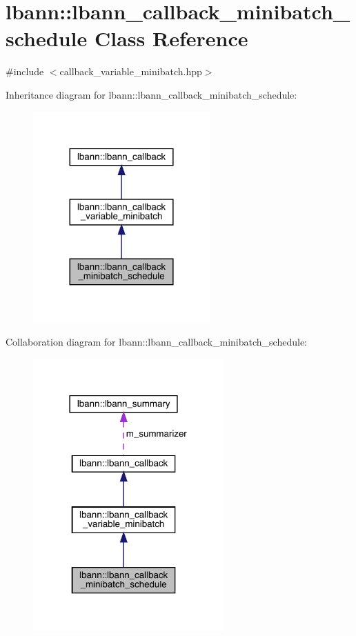 \hypertarget{classlbann_1_1lbann__callback__minibatch__schedule}{}\section{lbann\+:\+:lbann\+\_\+callback\+\_\+minibatch\+\_\+schedule Class Reference}
\label{classlbann_1_1lbann__callback__minibatch__schedule}


{\ttfamily \#include $<$callback\+\_\+variable\+\_\+minibatch.\+hpp$>$}



Inheritance diagram for lbann\+:\+:lbann\+\_\+callback\+\_\+minibatch\+\_\+schedule\+:\nopagebreak
\begin{figure}[H]
\begin{center}
\leavevmode
\includegraphics[width=192pt]{classlbann_1_1lbann__callback__minibatch__schedule__inherit__graph}
\end{center}
\end{figure}


Collaboration diagram for lbann\+:\+:lbann\+\_\+callback\+\_\+minibatch\+\_\+schedule\+:\nopagebreak
\begin{figure}[H]
\begin{center}
\leavevmode
\includegraphics[width=207pt]{classlbann_1_1lbann__callback__minibatch__schedule__coll__graph}
\end{center}
\end{figure}
